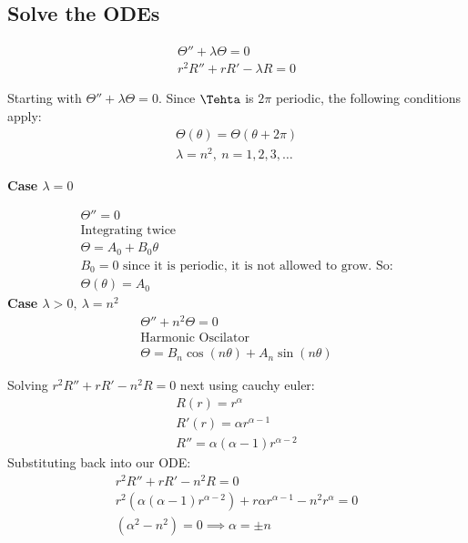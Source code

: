 \documentclass[11pt]{article}
\begin{document}
    \subsection{Solve the ODEs}
    \begin{gather*}
        \Theta'' + \lambda \Theta = 0\\
        r^2 R'' + rR' - \lambda R = 0
    \end{gather*}

    Starting with $\Theta'' + \lambda \Theta = 0$.
    Since $\Tehta$ is $2\pi$ periodic, the following conditions apply:
    \begin{gather*}
        \Theta(\theta) = \Theta(\theta + 2\pi)\\
        \lambda = n^2,\ n=1,2,3,\dots
    \end{gather*}
    
    \textbf{Case $\lambda=0$}

    \begin{gather*}
        \Theta'' = 0\\
        \text{Integrating twice}\\
        \Theta = A_0 + B_0\theta\\
        \text{$B_0=0$ since it is periodic, it is not allowed to grow. So:}\\
        \Theta(\theta) = A_0
    \end{gather*}
    \textbf{Case $\lambda > 0, \ \lambda = n^2$}
    \begin{gather*}
        \Theta'' + n^2\Theta = 0\\
        \text{Harmonic Oscilator}\\
        \Theta = B_n\cos(n\theta) + A_n\sin(n\theta)
    \end{gather*}

    Solving $r^2 R'' + rR' - n^2 R =0$ next using cauchy euler:
    \begin{gather*}
        R(r) = r^{\alpha}\\
        R'(r) = \alpha r^{\alpha -1}\\
        R'' = \alpha(\alpha -1) r ^{\alpha-2}
    \end{gather*}
    Substituting back into our ODE:
    \begin{gather*}
        r^2 R'' + rR' - n^2 R = 0\\
        r^2 (\alpha(\alpha -1) r ^{\alpha-2}) + r\alpha r^{\alpha -1} - n^2 r^{\alpha} = 0\\
        (\alpha^2 - n^2) = 0 \implies \alpha=\pm n
    \end{gather*}
\end{document}

